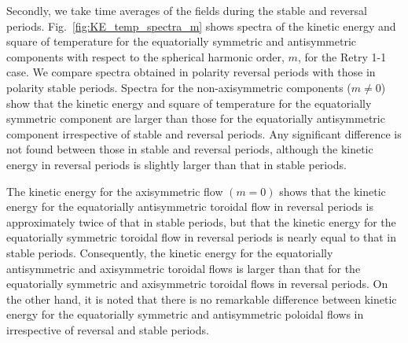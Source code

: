 {\color{magenta}
Secondly, we take time averages of the fields during the stable and reversal periods. 
} 
Fig.~\ref{fig:KE_temp_spectra_m} shows spectra of the kinetic energy and square of temperature for the equatorially symmetric and antisymmetric components
with respect to the spherical harmonic order, $m$, for the Retry 1-1 case.
We compare spectra obtained in polarity reversal periods with those in polarity stable periods.
Spectra for the non-axisymmetric components ($m \ne 0$) show that the kinetic energy and square of temperature for the equatorially symmetric component are larger than those for the equatorially antisymmetric component irrespective of stable and reversal periods.
Any significant difference is not found between those in stable and reversal periods, although the kinetic energy in reversal periods is slightly larger than that in stable periods.

{\color{teal}
The kinetic energy for the axisymmetric flow $(m = 0)$ shows that the kinetic energy for the equatorially antisymmetric toroidal flow in reversal periods is approximately twice of that in stable periods, but that the kinetic energy for the equatorially symmetric toroidal flow in reversal periods is nearly equal to that in stable periods.
}
Consequently, the kinetic energy for the equatorially antisymmetric and axisymmetric toroidal flows is larger than that for the equatorially symmetric and  axisymmetric toroidal flows in reversal periods.
{\color{teal}
On the other hand,
}
it is noted that there is no remarkable difference between kinetic energy for the equatorially symmetric and antisymmetric poloidal flows in irrespective of reversal and stable periods.

